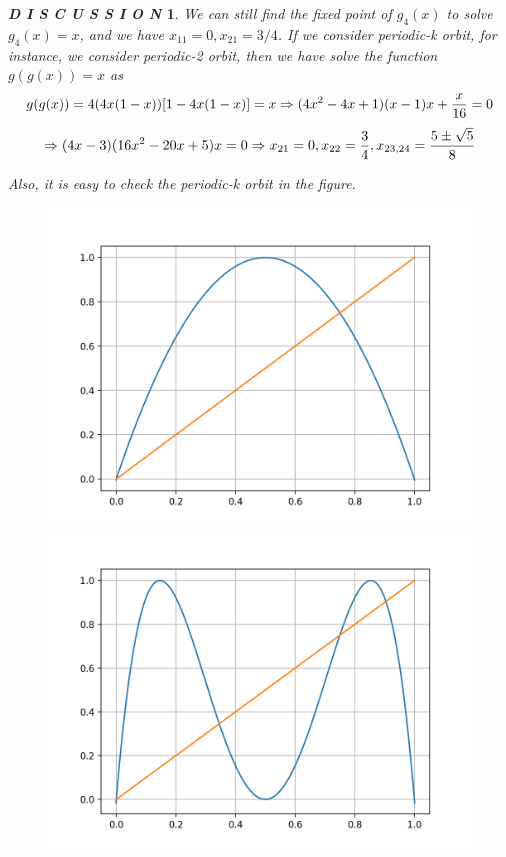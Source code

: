 \documentclass[12pt]{article}
\theoremstyle{plain}
\newtheorem{discussion}{\textit{D I S C U S S I O N}}[section]
\begin{document}
\begin{discussion}
We can still find the fixed point of $g_4(x)$ to solve $g_4(x) = x$, and we have $x_{11} = 0, x_{21} = {3/4}$. If we consider periodic-k orbit, for instance, we consider periodic-2 orbit, then we have solve the function $g(g(x)) = x$ as 
$$
g(g(x)) = 4(4x(1-x))[1-4x(1-x)] = x \Rightarrow (4x^2-4x+1)(x-1)x+{x\over 16} = 0 
$$
$$
\Rightarrow (4x-3)(16x^2 - 20x+5)x = 0 \Rightarrow x_{21} = 0, x_{22} = {3\over 4}, x_{23,24} = {5\pm \sqrt{5}\over 8}
$$

Also, it is easy to check the periodic-k orbit in the figure.\\[2ex]

\begin{figure}[H]
\begin{minipage}[c][0.24\width]{0.24\textwidth}
   \centering
   \includegraphics[width=\textwidth]{figure/section1/4-logistic-ite-1.png}
\end{minipage}
\begin{minipage}[c][0.24\width]{0.24\textwidth}
   \centering
   \includegraphics[width=\textwidth]{figure/section1/4-logistic-ite-2.png}

\end{minipage}
\end{figure}
\end{discussion}
\end{document}
